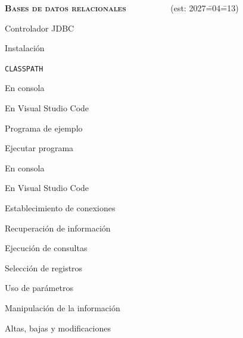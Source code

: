 \begin{longenum}
\begin{longenum}
\begin{longenum}
\begin{longenum}
            \end{longenum}
        \end{longenum}
    \end{longenum}
    \item \textbf{\textsc{Bases de datos relacionales}} \ \ \ \ \ \ \ \dual\ \ \ (est: 2027\==04\==13)
    \begin{longenum}
        \item Controlador JDBC
        \begin{longenum}
            \item Instalación
            \item \texttt{CLASSPATH}
            \begin{longenum}
                \item En consola
                \item En Visual Studio Code
            \end{longenum}
        \end{longenum}
        \item Programa de ejemplo
        \item Ejecutar programa
        \begin{longenum}
            \item En consola
            \item En Visual Studio Code
        \end{longenum}
        \item Establecimiento de conexiones
        \item Recuperación de información
        \begin{longenum}
            \item Ejecución de consultas
            \item Selección de registros
            \item Uso de parámetros
        \end{longenum}
        \item Manipulación de la información
        \begin{longenum}
            \item Altas, bajas y modificaciones
        \end{longenum}
    \end{longenum}
\end{longenum}
